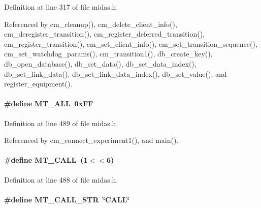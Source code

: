 Definition at line 317 of file midas.h.

Referenced by cm\_\-cleanup(), cm\_\-delete\_\-client\_\-info(), cm\_\-deregister\_\-transition(), cm\_\-register\_\-deferred\_\-transition(), cm\_\-register\_\-transition(), cm\_\-set\_\-client\_\-info(), cm\_\-set\_\-transition\_\-sequence(), cm\_\-set\_\-watchdog\_\-params(), cm\_\-transition1(), db\_\-create\_\-key(), db\_\-open\_\-database(), db\_\-set\_\-data(), db\_\-set\_\-data\_\-index(), db\_\-set\_\-link\_\-data(), db\_\-set\_\-link\_\-data\_\-index(), db\_\-set\_\-value(), and register\_\-equipment().
\paragraph[{MT\_\-ALL}]{\setlength{\rightskip}{0pt plus 5cm}\#define MT\_\-ALL~0xFF}\hfill\label{group__mdefineh_ga3378bf6f53a24392145df33c8acc9c0c}

\begin{DoxyItemize}
\item 
\end{DoxyItemize}

Definition at line 489 of file midas.h.

Referenced by cm\_\-connect\_\-experiment1(), and main().
\paragraph[{MT\_\-CALL}]{\setlength{\rightskip}{0pt plus 5cm}\#define MT\_\-CALL~(1$<$$<$6)}\hfill\label{group__mdefineh_gadcbf4bac0ba5a2fb4e81ed727775dbba}

\begin{DoxyItemize}
\item 
\end{DoxyItemize}

Definition at line 488 of file midas.h.
\paragraph[{MT\_\-CALL\_\-STR}]{\setlength{\rightskip}{0pt plus 5cm}\#define MT\_\-CALL\_\-STR~\char`\"{}CALL\char`\"{}}\hfill\label{group__mdefineh_ga3d6aa9f39fb5df6750e47fb639d1cfa3}


